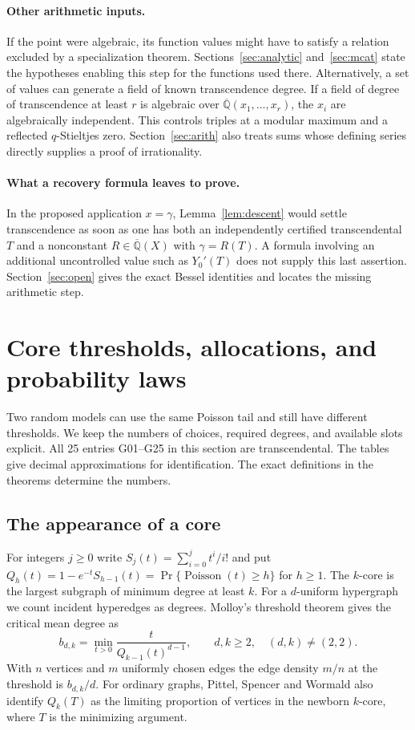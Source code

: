 \documentclass[11pt,a4paper]{article}
\theoremstyle{definition}
\theoremstyle{remark}
\begin{document}
\paragraph{Other arithmetic inputs.}
If the point were algebraic, its function values might have to satisfy a relation excluded by a specialization theorem. Sections~\ref{sec:analytic} and~\ref{sec:mcat} state the hypotheses enabling this step for the functions used there. Alternatively, a set of values can generate a field of known transcendence degree. If a field of degree of transcendence at least $r$ is algebraic over $\overline{\mathbb Q}(x_1,\ldots,x_r)$, the $x_i$ are algebraically independent. This controls triples at a modular maximum and a reflected $q$-Stieltjes zero. Section~\ref{sec:arith} also treats sums whose defining series directly supplies a proof of irrationality.
\paragraph{What a recovery formula leaves to prove.}
In the proposed application $x=\gamma$, Lemma~\ref{lem:descent} would settle transcendence as soon as one has both an independently certified transcendental $T$ and a nonconstant $R\in\overline{\mathbb Q}(X)$ with $\gamma=R(T)$. A formula involving an additional uncontrolled value such as $Y_0'(T)$ does not supply this last assertion. Section~\ref{sec:open} gives the exact Bessel identities and locates the missing arithmetic step.


\section{Core thresholds, allocations, and probability laws}
\label{sec:graph}
Two random models can use the same Poisson tail and still have different
thresholds. We keep the numbers of choices, required degrees, and available
slots explicit. All 25 entries G01--G25 in this section are transcendental.
The tables give decimal approximations for identification. The exact
definitions in the theorems determine the numbers.

\subsection{The appearance of a core}
For integers $j\geq 0$ write $S_j(t)=\sum_{i=0}^j t^i/i!$ and put
$Q_h(t)=1-e^{-t}S_{h-1}(t)=\Pr\{\operatorname{Poisson}(t)\ge h\}$
for $h\ge1$. The $k$-core is the largest subgraph of minimum degree at
least $k$. For a $d$-uniform hypergraph we count incident hyperedges as degrees.
Molloy's threshold theorem \cite{gMolloy} gives the critical
mean degree as
\[
   b_{d,k}=\min_{t>0}\frac{t}{Q_{k-1}(t)^{d-1}},
   \qquad d,k\ge2,\quad(d,k)\ne(2,2).
\]
With $n$ vertices and $m$ uniformly chosen edges the edge density $m/n$ at
the threshold is $b_{d,k}/d$. For ordinary graphs, Pittel, Spencer and
Wormald \cite{gPSW} also identify $Q_k(T)$ as the limiting proportion of
vertices in the newborn $k$-core, where $T$ is the minimizing argument.
\end{document}
